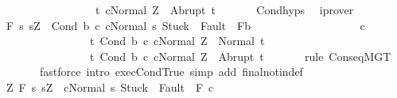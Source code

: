 \begin{isabellebody}
\ \ \ \ \ \ \ \ \ \ \ \ \ \ \ \ \ {\isacharbraceleft}t{\isachardot}\ {\isasymGamma}{\isasymturnstile}{\isasymlangle}c{}{\isacharcomma}Normal\ Z{\isasymrangle}\ {\isasymRightarrow}\ Abrupt\ t{\isacharbraceright}{\isachardoublequoteclose}\ \isanewline
\ \ \ \ \isamarkupfalse%
\ Cond{\isachardot}hyps\ \isamarkupfalse%
\ iprover\ \ \isanewline
\ \ \isamarkupfalse%
\ {\isachardoublequoteopen}{\isasymGamma}{\isacharcomma}{\isasymTheta}{\isasymturnstile}\isactrlbsub {\isacharslash}F\isactrlesub \ {\isacharparenleft}{\isacharbraceleft}s{\isachardot}\ s{\isacharequal}Z\ {\isasymand}\ {\isasymGamma}{\isasymturnstile}{\isasymlangle}Cond\ b\ c{}\ c{}{\isacharcomma}Normal\ s{\isasymrangle}\ {\isasymRightarrow}{\isasymnotin}{\isacharparenleft}{\isacharbraceleft}Stuck{\isacharbraceright}\ {\isasymunion}\ Fault\ {\isacharbackquote}\ {\isacharparenleft}{\isacharminus}F{\isacharparenright}{\isacharparenright}{\isacharbraceright}{\isasyminter}b{\isacharparenright}\isanewline
\ \ \ \ \ \ \ \ \ \ \ \ \ \ \ \ \ \ \ c{}\ \isanewline
\ \ \ \ \ \ \ \ \ \ \ \ \ \ \ \ {\isacharbraceleft}t{\isachardot}\ {\isasymGamma}{\isasymturnstile}{\isasymlangle}Cond\ b\ c{}\ c{}{\isacharcomma}Normal\ Z{\isasymrangle}\ {\isasymRightarrow}\ Normal\ t{\isacharbraceright}{\isacharcomma}\isanewline
\ \ \ \ \ \ \ \ \ \ \ \ \ \ \ \ {\isacharbraceleft}t{\isachardot}\ {\isasymGamma}{\isasymturnstile}{\isasymlangle}Cond\ b\ c{}\ c{}{\isacharcomma}Normal\ Z{\isasymrangle}\ {\isasymRightarrow}\ Abrupt\ t{\isacharbraceright}{\isachardoublequoteclose}\ \isanewline
\ \ \ \ \isamarkupfalse%
\ {\isacharparenleft}rule\ ConseqMGT{\isacharparenright}\isanewline
\ \ \ \ \ \ \ {\isacharparenleft}fastforce\ intro{\isacharcolon}\ exec{\isachardot}CondTrue\ simp\ add{\isacharcolon}\ final{\isacharunderscore}notin{\isacharunderscore}def{\isacharparenright}\isanewline
\ \ \isamarkupfalse%
\isanewline
\ \ \isamarkupfalse%
\ {\isachardoublequoteopen}{\isasymforall}Z{\isachardot}\ {\isasymGamma}{\isacharcomma}{\isasymTheta}{\isasymturnstile}\isactrlbsub {\isacharslash}F\isactrlesub \ {\isacharbraceleft}s{\isachardot}\ s{\isacharequal}Z\ {\isasymand}\ {\isasymGamma}{\isasymturnstile}{\isasymlangle}c{}{\isacharcomma}Normal\ s{\isasymrangle}\ {\isasymRightarrow}{\isasymnotin}{\isacharparenleft}{\isacharbraceleft}Stuck{\isacharbraceright}\ {\isasymunion}\ Fault\ {\isacharbackquote}\ {\isacharparenleft}{\isacharminus}F{\isacharparenright}{\isacharparenright}{\isacharbraceright}\ c{}\ \isanewline

\end{isabellebody}
